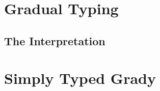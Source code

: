 \documentclass{entcs}
\begin{document}
\section{Gradual Typing}
\label{sec:gradual_typing}



\subsection{The Interpretation}
\label{subsec:the_interpretation}


\section{Simply Typed Grady}
\label{sec:sl-grady}





\appendix



\end{document}
